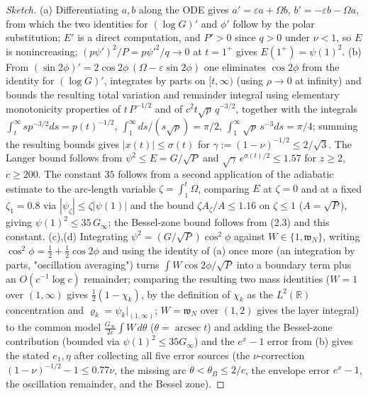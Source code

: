 \documentclass[11pt]{amsart}
\theoremstyle{definition}
\theoremstyle{remark}
\newcommand{\R}{\mathbb R}
\begin{document}
\begin{proof}[Sketch]
(a) Differentiating $a,b$ along the ODE gives $a'=\varepsilon a+\Omega b$, $b'=-\varepsilon b-\Omega a$, from which the two
identities for $(\log G)'$ and $\phi'$ follow by the polar substitution; $E'$ is a direct computation, and $P'>0$ since $q>0$
under $\nu<1$, so $E$ is nonincreasing; $(p\psi')^2/P=p\psi'^2/q\to0$ at $t=1^+$ gives $E(1^+)=\psi(1)^2$.
(b) From $(\sin2\phi)'=2\cos2\phi\,(\Omega-\varepsilon\sin2\phi)$ one eliminates $\cos2\phi$ from the identity for $(\log G)'$,
integrates by parts on $[t,\infty)$ (using $\rho\to0$ at infinity) and bounds the resulting total variation and remainder
integral using elementary monotonicity properties of $t\,P^{-1/2}$ and of $c^2t\sqrt p\,q^{-3/2}$, together with the integrals
$\int_t^\infty sp^{-3/2}ds=p(t)^{-1/2}$, $\int_1^\infty ds/(s\sqrt p)=\pi/2$, $\int_1^\infty\sqrt p\,s^{-3}ds=\pi/4$; summing the
resulting bounds gives $|x(t)|\le\sigma(t)$ for $\gamma:=(1-\nu)^{-1/2}\le2/\sqrt3$. The Langer bound follows from
$\psi^2\le E=G/\sqrt P$ and $\sqrt\gamma\,e^{\sigma(t)/2}\le1.57$ for $z\ge2$, $c\ge200$. The constant $35$ follows from a
second application of the adiabatic estimate to the arc-length variable $\zeta=\int_1^t\Omega$, comparing $E$ at $\zeta=0$ and
at a fixed $\zeta_1=0.8$ via $|\psi_\zeta|\le\zeta|\psi(1)|$ and the bound $\zeta A_\zeta/A\le1.16$ on $\zeta\le1$ ($A=\sqrt P$),
giving $\psi(1)^2\le35\,G_\infty$; the Bessel-zone bound follows from (2.3) and this constant.
(c),(d) Integrating $\psi^2=(G/\sqrt P)\cos^2\phi$ against $W\in\{1,\mathfrak w_N\}$, writing $\cos^2\phi=\frac12+\frac12\cos2\phi$ and
using the identity of (a) once more (an integration by parts, "oscillation averaging") turns $\int W\cos2\phi/\sqrt P$ into a
boundary term plus an $O(c^{-1}\log c)$ remainder; comparing the resulting two mass identities ($W=1$ over $(1,\infty)$ gives
$\tfrac12(1-\chi_k)$, by the definition of $\chi_k$ as the $L^2(\R)$ concentration and $\varrho_k=\psi_k|_{(1,\infty)}$; $W=\mathfrak w_N$
over $(1,2)$ gives the layer integral) to the common model $\frac{G_\infty}{2c}\int W\,d\theta$ ($\theta=\operatorname{arcsec}t$)
and adding the Bessel-zone contribution (bounded via $\psi(1)^2\le35G_\infty$) and the $e^x-1$ error from (b) gives the stated
$e_1,\eta$ after collecting all five error sources (the $\nu$-correction $(1-\nu)^{-1/2}-1\le0.77\nu$, the missing arc
$\theta<\theta_B\le2/c$, the envelope error $e^x-1$, the oscillation remainder, and the Bessel zone).
\end{proof}
\end{document}
